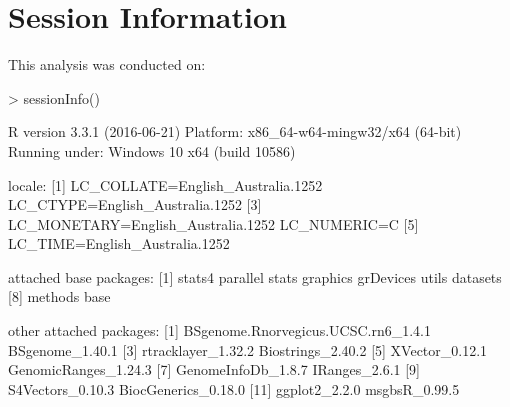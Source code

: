 \documentclass{article}
\begin{document}
\section{Session Information}
This analysis was conducted on:
\begin{Schunk}
\begin{Sinput}
> sessionInfo()
\end{Sinput}
\begin{Soutput}
R version 3.3.1 (2016-06-21)
Platform: x86_64-w64-mingw32/x64 (64-bit)
Running under: Windows 10 x64 (build 10586)

locale:
[1] LC_COLLATE=English_Australia.1252  LC_CTYPE=English_Australia.1252   
[3] LC_MONETARY=English_Australia.1252 LC_NUMERIC=C                      
[5] LC_TIME=English_Australia.1252    

attached base packages:
[1] stats4    parallel  stats     graphics  grDevices utils     datasets 
[8] methods   base     

other attached packages:
 [1] BSgenome.Rnorvegicus.UCSC.rn6_1.4.1 BSgenome_1.40.1                    
 [3] rtracklayer_1.32.2                  Biostrings_2.40.2                  
 [5] XVector_0.12.1                      GenomicRanges_1.24.3               
 [7] GenomeInfoDb_1.8.7                  IRanges_2.6.1                      
 [9] S4Vectors_0.10.3                    BiocGenerics_0.18.0                
[11] ggplot2_2.2.0                       msgbsR_0.99.5                      


\end{Soutput}
\end{Schunk}
\end{document}
